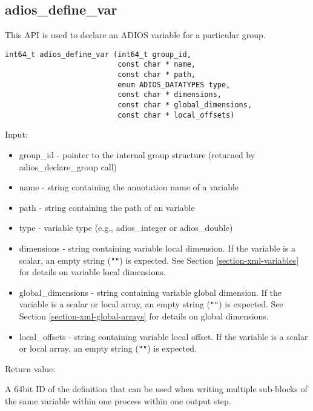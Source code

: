 \subsection{adios\_define\_var}

This API is used to declare an ADIOS variable for a particular group. 
\begin{lstlisting}[alsolanguage=C,caption={},label={}]
int64_t adios_define_var (int64_t group_id, 
                          const char * name,
                          const char * path,
                          enum ADIOS_DATATYPES type,
                          const char * dimensions,
                          const char * global_dimensions,
                          const char * local_offsets)
\end{lstlisting}

Input: 
\begin{itemize}
\item group\_id - pointer to the internal group structure (returned by adios\_declare\_group 
call)

\item name - string containing the annotation name of a variable

\item path - string containing the path of an variable 

\item type - variable type (e.g., adios\_integer or adios\_double) 

\item dimensions - string containing variable local dimension. 
If the variable is a scalar, an empty string (\verb+""+) is expected. 
See Section \ref{section-xml-variables} for details on variable local dimensions.

\item global\_dimensions - string containing variable global dimension. If the variable 
is a scalar or local array, an empty string (\verb+""+) is expected. 
See Section \ref{section-xml-global-arrays} for details on global dimensions.

\item local\_offsets - string containing variable local offset. If the variable is a 
scalar or local array, an empty string (\verb+""+) is expected.
\end{itemize}

Return value:

A 64bit ID of the definition that can be used when writing multiple sub-blocks 
of the same variable within one process within one output step. 

